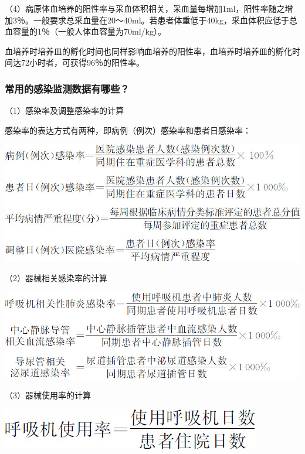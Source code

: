 （4）病原体血培养的阳性率与采血体积相关，采血量每增加1ml，阳性率随之增加3％。一般要求总采血量在20～40ml。若患者体重低于40kg，采血体积应低于总血容量的1％（一般人体血容量为70ml/kg）。

血培养时培养皿的孵化时间也同样影响血培养的阳性率，血培养时培养皿的孵化时间达72小时者，可获得96％的阳性率。

\subsubsection{常用的感染监测数据有哪些？}

（1）感染率及调整感染率的计算

感染率的表达方式有两种，即病例（例次）感染率和患者日感染率：

\begin{center}
\includegraphics{./images/Image00292.jpg}
\end{center}

（2）器械相关感染率的计算

\begin{center}
\includegraphics{./images/Image00293.jpg}
\end{center}

（3）器械使用率的计算

\begin{center}
\includegraphics{./images/Image00294.jpg}
\end{center}


